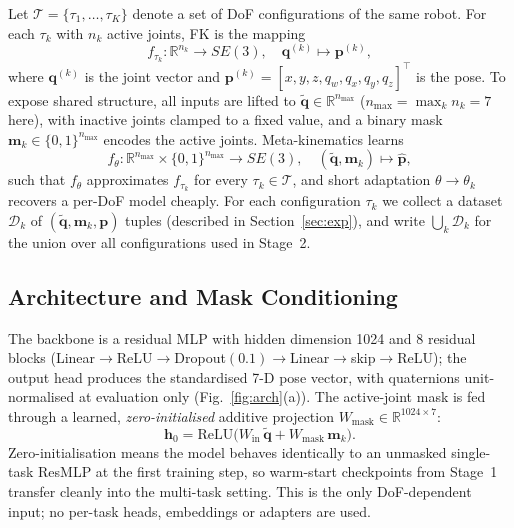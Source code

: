 \documentclass[conference]{IEEEtran}
\begin{document}
Let $\mathcal{T} = \{\tau_1,\dots,\tau_K\}$ denote a set of DoF configurations of the same robot. For each $\tau_k$ with $n_k$ active joints, FK is the mapping
\begin{equation}
f_{\tau_k}:\mathbb{R}^{n_k}\!\rightarrow\! SE(3),\quad \mathbf{q}^{(k)}\!\mapsto\! \mathbf{p}^{(k)},
\label{eq:fk}
\end{equation}
where $\mathbf{q}^{(k)}$ is the joint vector and $\mathbf{p}^{(k)}\!=\![x,y,z,q_w,q_x,q_y,q_z]^\top$ is the pose. To expose shared structure, all inputs are lifted to $\tilde{\mathbf{q}}\!\in\!\mathbb{R}^{n_{\max}}$ ($n_{\max}\!=\!\max_k n_k\!=\!7$ here), with inactive joints clamped to a fixed value, and a binary mask $\mathbf{m}_k\!\in\!\{0,1\}^{n_{\max}}$ encodes the active joints. Meta-kinematics learns
\begin{equation}
f_\theta:\mathbb{R}^{n_{\max}}\!\times\!\{0,1\}^{n_{\max}}\!\rightarrow\! SE(3),\quad (\tilde{\mathbf{q}},\mathbf{m}_k)\!\mapsto\!\hat{\mathbf{p}},
\label{eq:meta}
\end{equation}
such that $f_\theta$ approximates $f_{\tau_k}$ for every $\tau_k\!\in\!\mathcal{T}$, and short adaptation $\theta\!\rightarrow\!\theta_k$ recovers a per-DoF model cheaply. For each configuration $\tau_k$ we collect a dataset $\mathcal{D}_k$ of $(\tilde{\mathbf{q}},\mathbf{m}_k,\mathbf{p})$ tuples (described in Section~\ref{sec:exp}), and write $\bigcup_k \mathcal{D}_k$ for the union over all configurations used in Stage~2.

\subsection{Architecture and Mask Conditioning}

The backbone is a residual MLP with hidden dimension 1024 and 8 residual blocks (Linear$\rightarrow$ReLU$\rightarrow$Dropout$(0.1)\rightarrow$Linear$\rightarrow$skip$\rightarrow$ReLU); the output head produces the standardised 7-D pose vector, with quaternions unit-normalised at evaluation only (Fig.~\ref{fig:arch}(a)). The active-joint mask is fed through a learned, \emph{zero-initialised} additive projection $W_{\mathrm{mask}}\!\in\!\mathbb{R}^{1024\times 7}$:
\begin{equation}
\mathbf{h}_0 = \mathrm{ReLU}\bigl(W_{\mathrm{in}}\,\tilde{\mathbf{q}} + W_{\mathrm{mask}}\,\mathbf{m}_k\bigr).
\label{eq:mask_proj}
\end{equation}
Zero-initialisation means the model behaves identically to an unmasked single-task ResMLP at the first training step, so warm-start checkpoints from Stage~1 transfer cleanly into the multi-task setting. This is the only DoF-dependent input; no per-task heads, embeddings or adapters are used.
\end{document}
